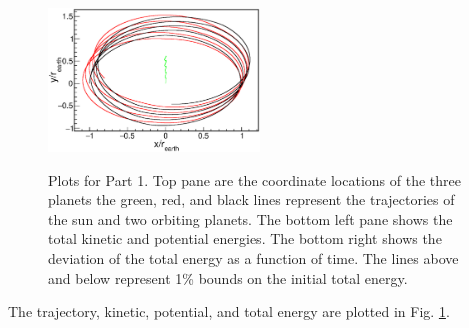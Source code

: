 \documentclass[singlepage,notitlepage,nofootinbib,11pt]{revtex4-1}
\begin{document}
\begin{figure}[h]
  \centering
  \includegraphics[width=0.5\textwidth]{figures/1r.eps}
  \\
\hfill
  \caption{\label{fig1} Plots for Part 1. Top pane are the coordinate locations of the three planets the green, red, and black lines represent the trajectories of the sun and two orbiting planets. The bottom left pane shows the total kinetic and potential energies. The bottom right shows the deviation of the total energy as a function of time. The lines above and below represent 1\% bounds on the initial total energy.}
\end{figure}
The trajectory, kinetic, potential, and total energy are plotted in Fig. \ref{fig1}.
\end{document}
